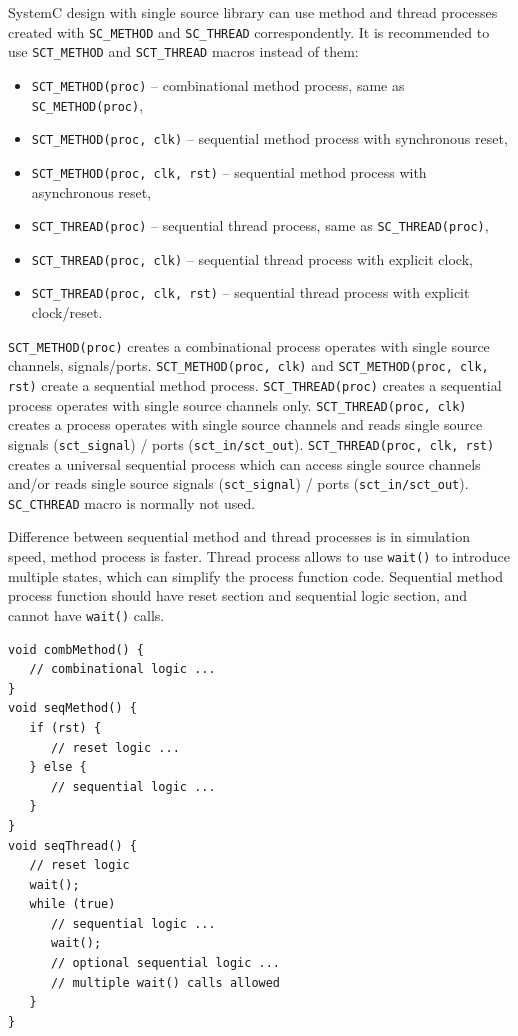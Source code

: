 SystemC design with single source library can use method and thread processes created with {\tt SC\_METHOD} and {\tt SC\_THREAD} correspondently. It is recommended to use {\tt SCT\_METHOD} and {\tt SCT\_THREAD} macros instead of them: 
%
\begin{itemize}
\item {\tt SCT\_METHOD(proc)} -- combinational method process, same as {\tt SC\_METHOD(proc)},
\item {\tt SCT\_METHOD(proc, clk)} -- sequential method process with synchronous reset,
\item {\tt SCT\_METHOD(proc, clk, rst)} -- sequential method process with asynchronous reset,
\item {\tt SCT\_THREAD(proc)} -- sequential thread process, same as {\tt SC\_THREAD(proc)},
\item {\tt SCT\_THREAD(proc, clk)} -- sequential thread process with explicit clock,
\item {\tt SCT\_THREAD(proc, clk, rst)} -- sequential thread process with explicit clock/reset.
\end{itemize}


{\tt SCT\_METHOD(proc)} creates a combinational process operates with single source channels, signals/ports. {\tt SCT\_METHOD(proc, clk)} and {\tt SCT\_METHOD(proc, clk, rst)} create a sequential method process. {\tt SCT\_THREAD(proc)} creates a sequential process operates with single source channels only. {\tt SCT\_THREAD(proc, clk)} creates a process operates with single source channels and reads single source signals ({\tt sct\_signal}) / ports ({\tt sct\_in/sct\_out}). {\tt SCT\_THREAD(proc, clk, rst)} creates a universal sequential process which can access single source channels and/or reads single source signals ({\tt sct\_signal}) / ports ({\tt sct\_in/sct\_out}). {\tt SC\_CTHREAD} macro is normally not used.

Difference between sequential method and thread processes is in simulation speed, method process is faster. Thread process allows to use {\tt wait()} to introduce multiple states, which can simplify the process function code. Sequential method process function should have reset section and sequential logic section, and cannot have {\tt wait()} calls.

\begin{lstlisting}[style=mycpp]
void combMethod() {
   // combinational logic ...
}
void seqMethod() {
   if (rst) {
      // reset logic ...
   } else {
      // sequential logic ...
   }
}
void seqThread() {
   // reset logic
   wait();
   while (true)
      // sequential logic ...
      wait();         
      // optional sequential logic ...
      // multiple wait() calls allowed
   }
}
\end{lstlisting}

